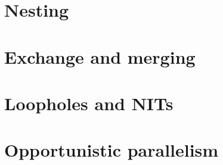 \section{Nesting}
\section{Exchange and merging}
\section{Loopholes and NITs}\label{sec:nit}
\section{Opportunistic parallelism}
